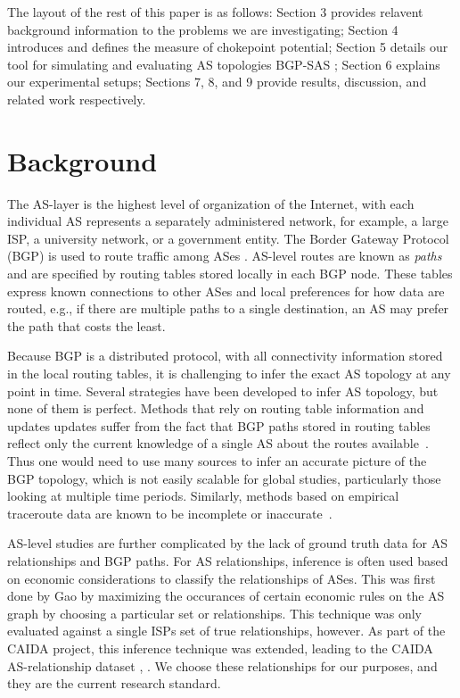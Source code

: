 \documentclass[10pt, conference, letterpaper]{IEEEtran}
\newcommand{\toolname}{BGP-SAS }
\begin{document}
\par
The layout of the rest of this paper is as follows: Section 3 provides relavent background information
to the problems we are investigating; Section 4 introduces and defines the measure of chokepoint
potential; Section 5 details our tool for simulating and evaluating AS topologies \toolname; Section 6
explains our experimental setups; Sections 7, 8, and 9 provide results, discussion, and related work
respectively.

\section{Background}

The AS-layer is the highest level of organization of the Internet, with each individual AS represents a separately administered network, for example, a large ISP, a university network, or a government entity. The Border Gateway Protocol (BGP) is used to route traffic among ASes \cite{bgp}.  AS-level routes are known as \emph{paths} and are specified by routing tables stored locally in each BGP node.  These tables express known connections to other ASes and local preferences for how data are routed, e.g., if there are multiple paths to a single destination, an AS may prefer the path that costs the least.

Because BGP is a distributed protocol, with all connectivity
information stored in the local routing tables, it is challenging to
infer the exact AS topology at any point in time.  Several strategies have been developed to infer AS topology, but none of them is perfect.  Methods that rely
on routing table information and updates
updates suffer from the fact that BGP paths stored in routing tables
reflect only the current knowledge of a single AS about the routes
available~\cite{BGPStream}.
Thus one would need to use many sources to infer an accurate
picture of the BGP topology, which is not easily scalable for
global studies, particularly those looking at multiple time periods.
Similarly, methods based on empirical traceroute data are known to be incomplete or inaccurate~\cite{tracerouteProblems}.

\par AS-level studies are further complicated by the lack of ground
truth data for AS relationships and BGP paths. For AS relationships,
inference is often used based on economic considerations to classify
the relationships of ASes. This was first done by Gao \cite{gao} by
maximizing the occurances of certain economic rules on the AS graph by
choosing a particular set or relationships. This technique was only
evaluated against a single ISPs set of true relationships, however. As
part of the CAIDA project, this inference technique was extended,
leading to the CAIDA AS-relationship dataset \cite{CAIDApaper},
\cite{CAIDA}. We choose these relationships for our purposes, and they
are the current research standard.
\end{document}
